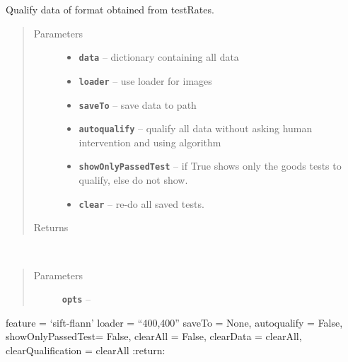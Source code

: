 \documentclass[letterpaper,10pt,english]{sphinxmanual}
\begin{document}
\begin{fulllineitems}
\label{RRtoolbox.tools:RRtoolbox.tools.restoration.qualifyData}
Qualify data of format obtained from testRates.
\begin{quote}\begin{description}
\item[{Parameters}] \leavevmode\begin{itemize}
\item {} 
\textbf{\texttt{data}} -- dictionary containing all data

\item {} 
\textbf{\texttt{loader}} -- use loader for images

\item {} 
\textbf{\texttt{saveTo}} -- save data to path

\item {} 
\textbf{\texttt{autoqualify}} -- qualify all data without asking human intervention and using algorithm

\item {} 
\textbf{\texttt{showOnlyPassedTest}} -- if True shows only the goods tests to qualify, else do not show.

\item {} 
\textbf{\texttt{clear}} -- re-do all saved tests.

\end{itemize}

\item[{Returns}] \leavevmode


\end{description}\end{quote}

\end{fulllineitems}


\begin{fulllineitems}
\label{RRtoolbox.tools:RRtoolbox.tools.restoration.stitch_multiple}~\begin{quote}\begin{description}
\item[{Parameters}] \leavevmode
\textbf{\texttt{opts}} -- 

\end{description}\end{quote}

feature = `sift-flann'
loader = ``400,400''
saveTo = None,
autoqualify = False,
showOnlyPassedTest= False,
clearAll = False,
clearData = clearAll,
clearQualification = clearAll
:return:

\end{fulllineitems}
\end{document}
